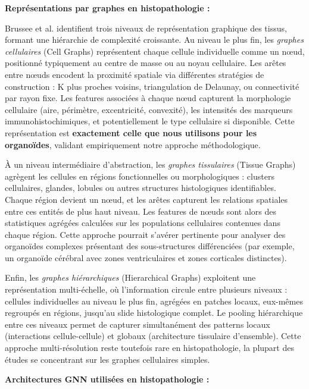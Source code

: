 \textbf{Représentations par graphes en histopathologie :}

Brussee et al. identifient trois niveaux de représentation graphique des tissus, formant une hiérarchie de complexité croissante. Au niveau le plus fin, les \textit{graphes cellulaires} (Cell Graphs) représentent chaque cellule individuelle comme un nœud, positionné typiquement au centre de masse ou au noyau cellulaire. Les arêtes entre nœuds encodent la proximité spatiale via différentes stratégies de construction : K plus proches voisins, triangulation de Delaunay, ou connectivité par rayon fixe. Les features associées à chaque nœud capturent la morphologie cellulaire (aire, périmètre, excentricité, convexité), les intensités des marqueurs immunohistochimiques, et potentiellement le type cellulaire si disponible. Cette représentation est \textbf{exactement celle que nous utilisons pour les organoïdes}, validant empiriquement notre approche méthodologique.

À un niveau intermédiaire d'abstraction, les \textit{graphes tissulaires} (Tissue Graphs) agrègent les cellules en régions fonctionnelles ou morphologiques : clusters cellulaires, glandes, lobules ou autres structures histologiques identifiables. Chaque région devient un nœud, et les arêtes capturent les relations spatiales entre ces entités de plus haut niveau. Les features de nœuds sont alors des statistiques agrégées calculées sur les populations cellulaires contenues dans chaque région. Cette approche pourrait s'avérer pertinente pour analyser des organoïdes complexes présentant des sous-structures différenciées (par exemple, un organoïde cérébral avec zones ventriculaires et zones corticales distinctes).

Enfin, les \textit{graphes hiérarchiques} (Hierarchical Graphs) exploitent une représentation multi-échelle, où l'information circule entre plusieurs niveaux : cellules individuelles au niveau le plus fin, agrégées en patches locaux, eux-mêmes regroupés en régions, jusqu'au slide histologique complet. Le pooling hiérarchique entre ces niveaux permet de capturer simultanément des patterns locaux (interactions cellule-cellule) et globaux (architecture tissulaire d'ensemble). Cette approche multi-résolution reste toutefois rare en histopathologie, la plupart des études se concentrant sur les graphes cellulaires simples.

\textbf{Architectures GNN utilisées en histopathologie :}

